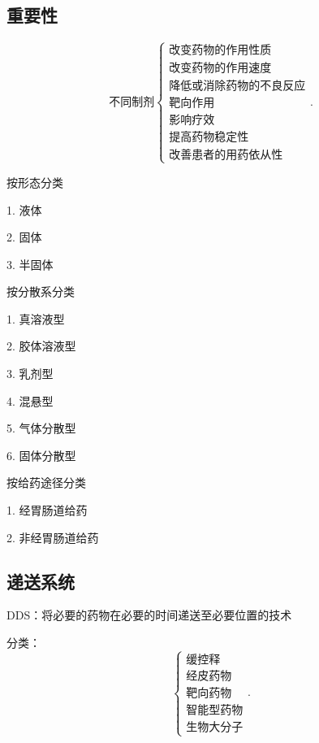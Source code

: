 \subsection{重要性}%
\label{sub:重要性}
\[
    \text{不同制剂}
    \begin{cases}
        \text{改变药物的作用性质}\\
        \text{改变药物的作用速度}\\
        \text{降低或消除药物的不良反应}\\
        \text{靶向作用}\\
        \text{影响疗效}\\
        \text{提高药物稳定性}\\
        \text{改善患者的用药依从性}
    \end{cases}
.\] 
\begin{notation}
    按形态分类

    1. 液体

    2. 固体

    3. 半固体
\end{notation}
\begin{notation}
    按分散系分类

    1. 真溶液型

    2. 胶体溶液型

    3. 乳剂型

    4. 混悬型

    5. 气体分散型

    6. 固体分散型
\end{notation}
\begin{notation}
    按给药途径分类

    1. 经胃肠道给药

    2. 非经胃肠道给药
\end{notation}
\subsection{递送系统}%
\label{sub:递送系统}
\begin{defi}
    DDS：将必要的药物在必要的时间递送至必要位置的技术
\end{defi}
分类：
\[
    \begin{cases}
        \text{缓控释}\\
        \text{经皮药物}\\
        \text{靶向药物}\\
        \text{智能型药物}\\
        \text{生物大分子}
    \end{cases}
.\] 
